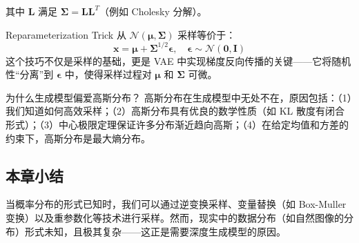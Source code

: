 其中 $\mathbf{L}$ 满足 $\boldsymbol{\Sigma} = \mathbf{L}\mathbf{L}^T$（例如 Cholesky 分解）。

\begin{importantbox}{Reparameterization Trick}
从 $\mathcal{N}(\boldsymbol{\mu}, \boldsymbol{\Sigma})$ 采样等价于：
$$\mathbf{x} = \boldsymbol{\mu} + \boldsymbol{\Sigma}^{1/2} \boldsymbol{\epsilon}, \quad \boldsymbol{\epsilon} \sim \mathcal{N}(\mathbf{0}, \mathbf{I})$$
这个技巧不仅是采样的基础，更是 VAE 中实现梯度反向传播的关键——它将随机性``分离''到 $\boldsymbol{\epsilon}$ 中，使得采样过程对 $\boldsymbol{\mu}$ 和 $\boldsymbol{\Sigma}$ 可微。
\end{importantbox}

\begin{knowledgebox}{为什么生成模型偏爱高斯分布？}
高斯分布在生成模型中无处不在，原因包括：（1）我们知道如何高效采样；（2）高斯分布具有优良的数学性质（如 KL 散度有闭合形式）；（3）中心极限定理保证许多分布渐近趋向高斯；（4）在给定均值和方差的约束下，高斯分布是最大熵分布。
\end{knowledgebox}

\subsection{本章小结}

当概率分布的形式已知时，我们可以通过逆变换采样、变量替换（如 Box-Muller 变换）以及重参数化等技术进行采样。然而，现实中的数据分布（如自然图像的分布）形式未知，且极其复杂——这正是需要深度生成模型的原因。

\newpage

